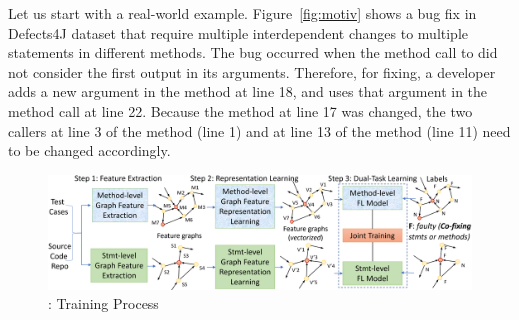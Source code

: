 Let us start with a real-world example.
Figure~\ref{fig:motiv} shows a bug fix in Defects4J dataset that
require multiple interdependent changes to multiple statements in
different methods. The bug occurred when the method call to
 did not consider the first output in its
arguments. Therefore, for fixing, a developer adds a new argument in
the method  at line 18, and uses that argument in the
method call  at line
22. Because the method  at line 17 was changed, the two
callers at line 3 of the method  (line 1) and at line
13 of the method  (line 11) need to be changed
accordingly.




\begin{figure}[t]
	\centering
	\includegraphics[width=5.65in]{graphs/overview-training-4.png} %
        \vspace{-6pt}
	\caption{{\tool}: Training Process}
        \label{train-overview}
\end{figure}


